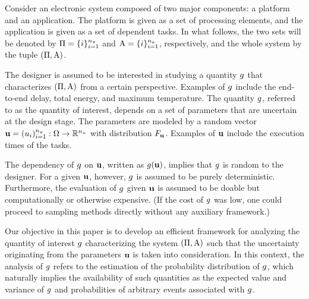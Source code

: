 Consider an electronic system composed of two major components: a platform and
an application. The platform is given as a set of processing elements, and the
application is given as a set of dependent tasks. In what follows, the two sets
will be denoted by $\Pi = \{ i \}_{i = 1}^{n_\pi}$ and $\mathrm{A} = \{ i \}_{i =
1}^{n_a}$, respectively, and the whole system by the tuple $(\Pi, \mathrm{A})$.

The designer is assumed to be interested in studying a quantity $g$ that
characterizes $(\Pi, \mathrm{A})$ from a certain perspective. Examples of $g$
include the end-to-end delay, total energy, and maximum temperature. The
quantity $g$, referred to as the quantity of interest, depends on a set of
parameters that are uncertain at the design stage. The parameters are modeled by
a random vector $\mathbf{u} = (u_i)_{i = 1}^{n_u}: \Omega \to \mathbb{R}^{n_u}$ with
distribution $F_{\mathbf{u}}$. Examples of $\mathbf{u}$ include the execution times
of the tasks.

The dependency of $g$ on $\mathbf{u}$, written as $g(\mathbf{u})$, implies that $g$ is
random to the designer. For a given $\mathbf{u}$, however, $g$ is assumed to be purely
deterministic. Furthermore, the evaluation of $g$ given $\mathbf{u}$ is assumed to be
doable but computationally or otherwise expensive. (If the cost of $g$ was low,
one could proceed to sampling methods directly without any auxiliary framework.)

Our objective in this paper is to develop an efficient framework for analyzing
the quantity of interest $g$ characterizing the system $(\Pi, \mathrm{A})$ such
that the uncertainty originating from the parameters $\mathbf{u}$ is taken into
consideration. In this context, the analysis of $g$ refers to the estimation of
the probability distribution of $g$, which naturally implies the availability
of such quantities as the expected value and variance of $g$ and probabilities
of arbitrary events associated with $g$.
